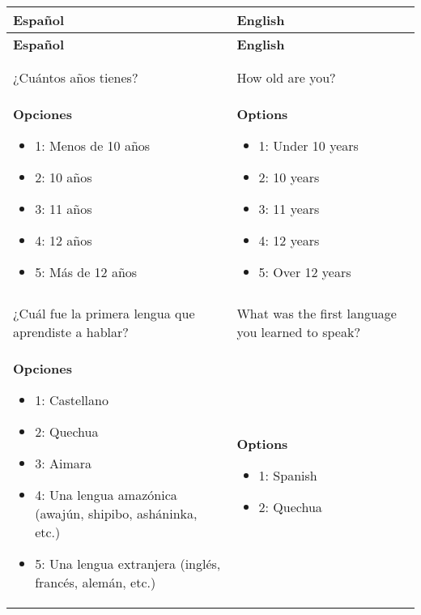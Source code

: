 \documentclass[11pt]{article}
\begin{document}
\newpage
\begin{longtable}{@{}LL@{}}
\toprule
\textbf{Español} & \textbf{English} \\ 
\midrule
\endfirsthead
\toprule
\textbf{Español} & \textbf{English} \\ 
\midrule
\endhead
\bottomrule \\ 
\endfoot
\bottomrule
{} \\ 
¿Cuántos años tienes? & How old are you? \\
\textbf{Opciones}\par\begin{itemize}[leftmargin=*]\item 1: Menos de 10 años
\item 2: 10 años
\item 3: 11 años
\item 4: 12 años
\item 5: Más de 12 años\end{itemize} & \textbf{Options}\par\begin{itemize}[leftmargin=*]\item 1: Under 10 years
\item 2: 10 years
\item 3: 11 years
\item 4: 12 years
\item 5: Over 12 years\end{itemize} \\
\addlinespace[4pt]
 \\ 
¿Cuál fue la primera lengua que aprendiste a hablar? & What was the first language you learned to speak? \\
\textbf{Opciones}\par\begin{itemize}[leftmargin=*]\item 1: Castellano
\item 2: Quechua
\item 3: Aimara
\item 4: Una lengua amazónica (awajún, shipibo, asháninka, etc.)
\item 5: Una lengua extranjera (inglés, francés, alemán, etc.)\end{itemize} & \textbf{Options}\par\begin{itemize}[leftmargin=*]\item 1: Spanish
\item 2: Quechua

\end{itemize}
\end{longtable}
\end{document}

